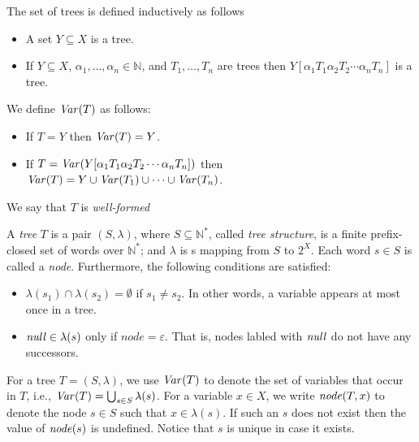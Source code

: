 \newcommand{\tuple}[1]{\left(#1\right)}
\newcommand{\set}[1]{\left\{#1\right\}}
\newcommand{\setcomp}[2]{\left\{#1|\,#2\right\}}
\newcommand{\nat}{\mathbb{N}}
\newcommand{\vars}{X}
\newcommand{\xvars}{X}
\newcommand{\yvars}{Y}
\newcommand{\varsof}[1]{{\it Var}\!\left(#1\right)}
\newcommand{\var}{x}
\newcommand{\xvar}{x}
\newcommand{\yvar}{y}
\newcommand{\pointer}{{\it pointer}\;}
\newcommand{\assigned}{:=}
\newcommand{\equals}{=}
\newcommand{\nequals}{\neq}
\newcommand{\nil}{{\it null}}
\newcommand{\nxt}[1]{#1.{\it next}}
\newcommand{\tree}{T}
\newcommand{\str}{S}
\newcommand{\labeling}{\lambda}
\newcommand{\node}{s}
\newcommand{\nodeof}[1]{{\it node}\!\left(#1\right)}
\newcommand{\clstr}{r}
\newcommand{\conf}{c}
\newcommand{\emptystring}{\varepsilon}



\newcommand{\gap}{\alpha}
\newcommand{\btree}[2]{#1\!\left[#2\right]}



The set of trees is defined inductively as follows
\begin{itemize}
\item
A set $\yvars\subseteq\xvars$ is a tree.
\item
If $\yvars\subseteq\vars$, $\gap_1,\ldots,\gap_n\in\nat$,
and $\tree_1,\ldots,\tree_n$ are trees then
$\btree{\yvars}{\gap_1\tree_1\gap_2\tree_2\cdots\gap_n\tree_n}$ is a tree.
\end{itemize}
We define $\varsof{\tree}$ as follows:
\begin{itemize}
\item
If $\tree=\yvars$ then $\varsof{\tree}=\yvars$.
\item
If
$\tree=\varsof{\btree{\yvars}{\gap_1\tree_1\gap_2\tree_2\cdots\gap_n\tree_n}}$
then $\varsof{\tree}=\yvars\cup\varsof{\tree_1}\cup\cdots\cup\varsof{\tree_n}$.
\end{itemize}
We say that $\tree$ is {\it well-formed}




%
A {\it tree} $\tree$ is a pair $\tuple{\str,\labeling}$, where 
 $\str\subseteq\nat^*$, called {\it tree structure}, is a finite  prefix-closed set of words
over $\nat^*$;
and $\labeling$ is s mapping from $\str$ to $2^\vars$.
%
Each word $\node\in\str$ is called a {\it node}.
%
Furthermore, the following conditions are satisfied:
\begin{itemize}
\item
$\labeling(\node_1)\cap\labeling(\node_2)=\emptyset$
if $\node_1\neq\node_2$.
%
In other words, a variable appears at most once in a tree.
\item
$\nil\in\labeling(\node)$ only if $node=\emptystring$.
%
That is, nodes labled with $\nil$ do not have any successors.
\end{itemize}
%
For a tree $\tree=\tuple{\str,\labeling}$, we use $\varsof{\tree}$ to denote the set
of variables that occur in $\tree$, i.e.,
$\varsof{\tree}=\bigcup_{\node\in\str}\labeling(\node)$.
%
For a variable $\var\in\vars$, we write
$\nodeof{\tree,\var}$ to denote the node $\node\in\str$ such that
$\var\in\labeling(\node)$.
%
If such an $\node$ does not exist then the value of $\nodeof{\node}$ is undefined.
%
Notice that $\node$ is unique in case it exists.


